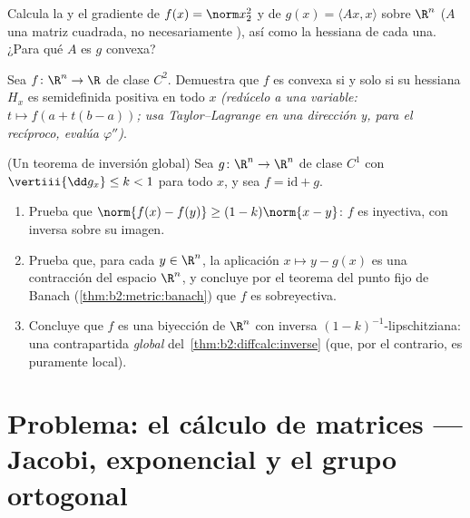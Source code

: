 \begin{exercise}[$\star$]\label{exo:b2:diffcalc:10}
Calcula la  y el gradiente de $f(x) = \norm x_2^2$ y de
$g(x) = \langle Ax, x\rangle$ sobre $\R^n$ ($A$ una matriz cuadrada,
no necesariamente ), así como la hessiana de cada una. ¿Para
qué $A$ es $g$ convexa?
\end{exercise}

\begin{exercise}[$\star\star$]\label{exo:b2:diffcalc:11}
Sea $f \colon \R^n \to \R$ de clase $C^2$. Demuestra que $f$ es
convexa si y solo si su hessiana $H_x$ es semidefinida positiva en
todo $x$ \emph{(redúcelo a una variable: $t \mapsto f(a + t(b-a))$;
usa Taylor--Lagrange en una dirección y, para el recíproco, evalúa
$\varphi''$)}.
\end{exercise}

\begin{exercise}[$\star\star\star$]\label{exo:b2:diffcalc:12}
(Un teorema de inversión global) Sea $g \colon \R^n \to \R^n$ de
clase $C^1$ con $\vertiii{\dd g_x} \leq k < 1$ para todo $x$, y sea
$f = \mathrm{id} + g$.
\begin{enumerate}
  \item Prueba que $\norm{f(x) - f(y)} \geq (1 - k)\norm{x - y}$:
        $f$ es inyectiva, con inversa  sobre su imagen.
  \item Prueba que, para cada $y \in \R^n$, la aplicación $x \mapsto
        y - g(x)$ es una contracción del espacio  $\R^n$, y
        concluye por el teorema del punto fijo de Banach
        (\cref{thm:b2:metric:banach}) que $f$ es sobreyectiva.
  \item Concluye que $f$ es una biyección de $\R^n$ con inversa
        $(1-k)^{-1}$-lipschitziana: una contrapartida \emph{global}
        del~\cref{thm:b2:diffcalc:inverse} (que, por el contrario,
        es puramente local).
\end{enumerate}
\end{exercise}

\section{Problema: el cálculo de matrices --- Jacobi, exponencial y
el grupo ortogonal}

